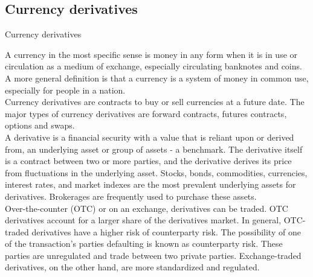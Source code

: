 \documentclass[unknownkeysallowed, compress]{beamer}
\theoremstyle{plain}
\begin{document}
\subsection{Currency derivatives}
\begin{frame}[allowframebreaks]{Currency derivatives}
\noindent
\par A currency in the most specific sense is money in any form when it is in use or
circulation as a medium of exchange, especially circulating banknotes and coins. A more
general definition is that a currency is a system of money in common use, especially for
people in a nation.\\
Currency derivatives are contracts to buy or sell currencies at a future date. The major
types of currency derivatives are forward contracts, futures contracts, options and swaps.\\
A derivative is a financial security with a value that is reliant upon or derived from, an
underlying asset or group of assets - a benchmark. The derivative itself is a contract
between two or more parties, and the derivative derives its price from fluctuations in the
underlying asset. Stocks, bonds, commodities, currencies, interest rates, and market
indexes are the most prevalent underlying assets for derivatives. Brokerages are
frequently used to purchase these assets.\\
Over-the-counter (OTC) or on an exchange, derivatives can be traded. OTC derivatives
account for a larger share of the derivatives market. In general, OTC-traded derivatives
have a higher risk of counterparty risk. The possibility of one of the transaction's parties
defaulting is known as counterparty risk. These parties are unregulated and trade
between two private parties. Exchange-traded derivatives, on the other hand, are more
standardized and regulated.

\end{frame}
\end{document}

